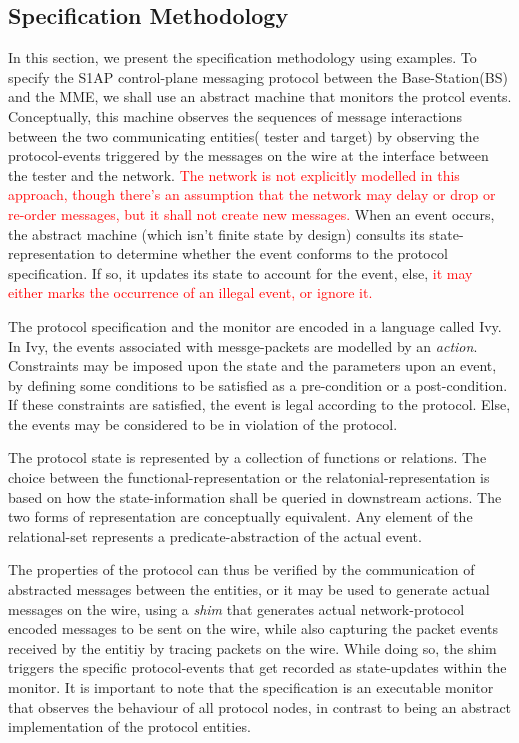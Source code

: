\documentclass[acmsmall,review,authorversion]{acmart}
\begin{document}
\subsection{Specification Methodology }
In this section, we present the specification methodology using examples. To specify the S1AP control-plane messaging protocol between the Base-Station(BS) and the MME, we shall use an abstract machine that monitors the protcol events. Conceptually, this machine observes the sequences of message interactions between the two communicating entities( tester and target) by observing the protocol-events triggered by the messages on the wire at the interface between the tester and the network. 
\textcolor{red}{The network is not explicitly modelled in this approach, though there's an assumption that the network may delay or drop or re-order messages, but it shall not create new messages. }
When an event occurs, the abstract machine (which isn't finite state by design) consults its state-representation to determine whether the event conforms to the protocol specification. If so, it updates its state to account for the event, else, \textcolor{red}{it may either marks the occurrence of an illegal event, or ignore it.} 

The protocol specification and the monitor are encoded in a language called Ivy. In Ivy, the events associated with messge-packets are modelled by an \textit{action}. Constraints may be imposed upon the state and the parameters upon an event, by defining  some conditions to be satisfied as a pre-condition or a post-condition. If these constraints are satisfied, the event is legal according to the protocol. Else, the events may be considered to be in violation of the protocol. 

The protocol state is represented by a collection of functions or relations. The choice between the functional-representation or the relatonial-representation is based on how the state-information shall be queried in downstream actions. The two forms of representation are conceptually equivalent. Any element of the relational-set represents a predicate-abstraction of the actual event. 

The properties of the protocol can thus be verified by the communication of abstracted messages between the entities, or it may be used to generate actual messages on the wire, using a \textit{shim} that generates actual network-protocol encoded messages to be sent on the wire, while also capturing the packet events received by the entitiy by tracing packets on the wire. While doing so, the shim triggers the specific protocol-events that get recorded as state-updates within the monitor. It is important to note that the specification is an executable monitor that observes the behaviour of all protocol nodes, in contrast to being an abstract implementation of the protocol entities. 
\end{document}
